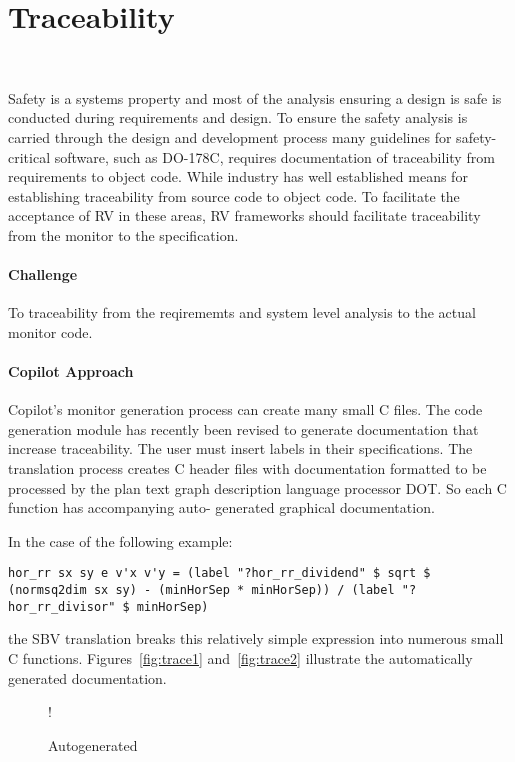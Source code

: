 \section{Traceability}~\label{sec:trace}

Safety is a systems property and most of the analysis ensuring a
design is safe is conducted during requirements and design.  To ensure
the safety analysis is carried through the design and development
process many guidelines for safety-critical software, such as DO-178C,
requires documentation of traceability from requirements to object
code. While industry has well established means for establishing
traceability from source code to object code.  To facilitate the
acceptance of RV in these areas, RV frameworks should facilitate
traceability from the monitor to the specification.

 \paragraph{Challenge} 
To  traceability from the reqirememts and system level analysis to the actual monitor code. 

\paragraph{Copilot Approach} Copilot's monitor generation process can create many small C
files. The code generation module has recently been revised to
generate documentation that increase  traceability. The
user must   insert labels in their specifications. The translation process
creates C header files with documentation formatted to be processed by
the plan text graph description language processor  DOT.  So each C 
function has accompanying  auto- generated graphical documentation.

In the case of the following example: 
\begin{lstlisting}[frame=single]
hor_rr sx sy e v'x v'y = (label "?hor_rr_dividend" $ sqrt $ (normsq2dim sx sy) - (minHorSep * minHorSep)) / (label "?hor_rr_divisor" $ minHorSep)
\end{lstlisting}  
the SBV translation breaks this relatively simple expression into
numerous small C functions. Figures~\ref{fig:trace1}
and~\ref{fig:trace2} illustrate the automatically generated
documentation. 


\begin{figure}[ht!]
        \centering
        \resizebox {0.4\textwidth} {!} {
}
        \caption{Autogenerated }
        \label{fig:trace}
        \end{figure}

